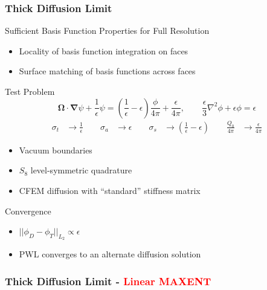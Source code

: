 \documentclass[compress,10pt]{beamer}
\renewcommand{\vec}[1]{\mathbf{#1}}
\newcommand{\tcr}[1]{\textcolor{red}{#1}}
\begin{document}
\begin{frame}[t]
{
\frametitle{\small Thick Diffusion Limit}{\small
\vspace{-3mm}
\begin{block}{Sufficient Basis Function Properties for Full Resolution}
\begin{itemize}
\item Locality of basis function integration on faces
\item Surface matching of basis functions across faces
\end{itemize}
\end{block}
\vspace{-3mm}
\begin{block}{Test Problem}
\begin{equation*}
\vec{\Omega} \cdot \vec{\nabla} \psi + \frac{1}{\epsilon} \psi =  \left( \frac{1}{\epsilon} - \epsilon   \right)  \frac{\phi}{4 \pi} +  \frac{\epsilon}{4 \pi},  \qquad \frac{\epsilon}{3} {\nabla}^2 \phi + \epsilon  \phi =  \epsilon
\end{equation*}
\vspace{1mm}
\begin{equation*}
\begin{aligned}
	\sigma_t &\rightarrow \frac{1}{\epsilon}  \qquad
	\sigma_a &\rightarrow \epsilon  \qquad
	\sigma_s &\rightarrow \left( \frac{1}{\epsilon} - \epsilon   \right)  \qquad
	\frac{Q_0}{4 \pi} &\rightarrow  \frac{\epsilon}{4 \pi}
\end{aligned}
\end{equation*}
\vspace{-1mm}
\begin{itemize}
\item Vacuum boundaries
\item $S_8$ level-symmetric quadrature
\item CFEM diffusion with ``standard'' stiffness matrix
\end{itemize}
\end{block}
\vspace{-3mm}
\begin{block}{Convergence}
\begin{itemize}
\item $|| \phi_D - \phi_T||_{L_2} \propto \epsilon$
\item PWL converges to an alternate diffusion solution
\end{itemize}
\end{block}
}
}
{
\frametitle{Thick Diffusion Limit - \tcr{Linear MAXENT}}
}
\end{frame}
\end{document}
